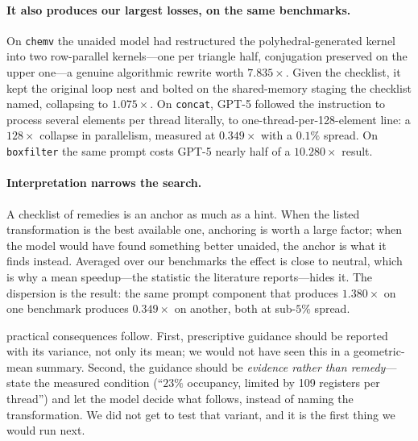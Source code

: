 \paragraph{It also produces our largest losses, on the same benchmarks.}
On \texttt{chemv} the unaided model had restructured the polyhedral-generated kernel into two
row-parallel kernels---one per triangle half, conjugation preserved on the upper one---a genuine
algorithmic rewrite worth $7.835\times$. Given the checklist, it kept the original loop nest and bolted
on the shared-memory staging the checklist named, collapsing to $1.075\times$. On \texttt{concat},
GPT-5 followed the instruction to process several elements per thread literally, to
one-thread-per-128-element line: a $128\times$ collapse in parallelism, measured at $0.349\times$ with a
$0.1\%$ spread. On \texttt{boxfilter} the same prompt costs GPT-5 nearly half of a $10.280\times$ result.

\paragraph{Interpretation narrows the search.}
A checklist of remedies is an anchor as much as a hint. When the listed transformation is the best
available one, anchoring is worth a large factor; when the model would have found something better
unaided, the anchor is what it finds instead. Averaged over our benchmarks the effect is close to
neutral, which is why a mean speedup---the statistic the literature reports---hides it. The dispersion
is the result: the same prompt component that produces $1.380\times$ on one benchmark produces
$0.349\times$ on another, both at sub-$5\%$ spread.

 practical consequences follow. First, prescriptive guidance should be reported with its variance,
not only its mean; we would not have seen this in a geometric-mean summary. Second, the guidance should
be \emph{evidence rather than remedy}---state the measured condition (``$23\%$ occupancy, limited by
109 registers per thread'') and let the model decide what follows, instead of naming the
transformation. We did not get to test that variant, and it is the first thing we would run next.
